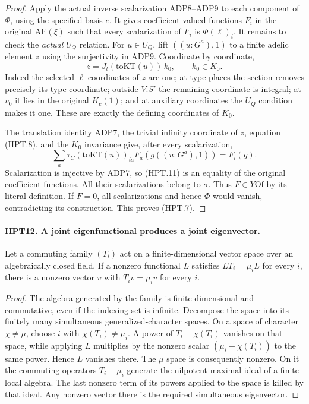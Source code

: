 \documentclass[11pt,a4paper]{article}
\numberwithin{equation}{section}
\theoremstyle{remark}\newtheorem{remark}[theorem]{Remark}
\begin{document}
\begin{proof}
Apply the actual inverse scalarization ADP8--ADP9 to each
component of $\Phi$, using the specified basis $e$.  It gives
coefficient-valued functions $F_i$ in the original $\mathrm{AF}(\xi)$
such that every scalarization of $F_i$ is $\Phi(\ell)_i$.
It remains to check the \emph{actual} $U_Q$ relation.  For
$u\in U_Q$, lift $((u: G^a),1)$ to a finite adelic element $z$
using the surjectivity in ADP9.  Coordinate by coordinate,
\[
                      z=J_t(\mathrm{toKT}(u))\,k_0,
                                      \qquad k_0\in K_0.        \tag{HPT.10}
\]
Indeed the selected $\ell$-coordinates of $z$ are one; at type
places the section removes precisely its type coordinate;
outside $V.S'$ the remaining coordinate is integral; at $v_0$
it lies in the original $K_c(1)$; and at auxiliary coordinates
the $U_Q$ condition makes it one.  These are exactly the
defining coordinates of $K_0$.

The translation identity ADP7, the trivial infinity coordinate
of $z$, equation (HPT.8), and the $K_0$ invariance give, after
every scalarization,
\[
       \sum_a\tau_C(\mathrm{toKT}(u))_{ia}
                     F_a(g((u: G^a),1))=F_i(g).               \tag{HPT.11}
\]
Scalarization is injective by ADP7, so (HPT.11) is an equality
of the original coefficient functions.  All their scalarizations
belong to $\sigma$.  Thus $F\in Y\mathrm{Of}$ by its literal
definition.  If $F=0$, all scalarizations and hence $\Phi$ would
vanish, contradicting its construction.  This proves (HPT.7).
\end{proof}

\paragraph{HPT12. A joint eigenfunctional produces a joint eigenvector.}
\label{claim:HPT12}
Let a commuting family $(T_i)$ act on a finite-dimensional vector
space over an algebraically closed field.  If a nonzero functional
$L$ satisfies $LT_i=\mu_iL$ for every $i$, there is a nonzero vector
$v$ with $T_iv=\mu_iv$ for every $i$.
\begin{proof}
The algebra generated by the family is finite-dimensional and
commutative, even if the indexing set is infinite.  Decompose the
space into its finitely many simultaneous generalized-character
spaces.  On a space of character $\chi\ne\mu$, choose $i$ with
$\chi(T_i)\ne\mu_i$.  A power of $T_i-\chi(T_i)$ vanishes on
that space, while applying $L$ multiplies by the nonzero scalar
$(\mu_i-\chi(T_i))$ to the same power.  Hence $L$ vanishes there.
The $\mu$ space is consequently nonzero.  On it the commuting
operators $T_i-\mu_i$ generate the nilpotent maximal ideal of a
finite local algebra.  The last nonzero term of its powers applied
to the space is killed by that ideal.  Any nonzero vector there
is the required simultaneous eigenvector.
\end{proof}
\end{document}
